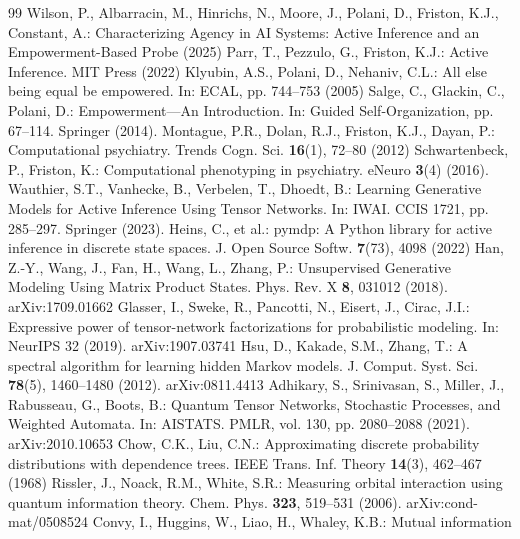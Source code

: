\documentclass[runningheads]{llncs}
\begin{document}
\begin{thebibliography}{99}
 Wilson, P., Albarracin, M., Hinrichs, N., Moore, J.,
Polani, D., Friston, K.J., Constant, A.: Characterizing Agency in AI Systems: Active
Inference and an Empowerment-Based Probe (2025)
 Parr, T., Pezzulo, G., Friston, K.J.: Active Inference. MIT Press (2022)
 Klyubin, A.S., Polani, D., Nehaniv, C.L.: All else being equal be
empowered. In: ECAL, pp. 744--753 (2005)
 Salge, C., Glackin, C., Polani, D.: Empowerment---An Introduction.
In: Guided Self-Organization, pp. 67--114. Springer (2014). 
 Montague, P.R., Dolan, R.J., Friston, K.J., Dayan, P.:
Computational psychiatry. Trends Cogn. Sci. \textbf{16}(1), 72--80 (2012)
 Schwartenbeck, P., Friston, K.: Computational phenotyping in
psychiatry. eNeuro \textbf{3}(4) (2016). 
 Wauthier, S.T., Vanhecke, B., Verbelen, T., Dhoedt, B.: Learning
Generative Models for Active Inference Using Tensor Networks. In: IWAI. CCIS 1721,
pp. 285--297. Springer (2023). 
 Heins, C., et al.: pymdp: A Python library for active inference
in discrete state spaces. J. Open Source Softw. \textbf{7}(73), 4098 (2022)
 Han, Z.-Y., Wang, J., Fan, H., Wang, L., Zhang, P.: Unsupervised
Generative Modeling Using Matrix Product States. Phys. Rev. X \textbf{8}, 031012 (2018).
arXiv:1709.01662
 Glasser, I., Sweke, R., Pancotti, N., Eisert, J., Cirac, J.I.:
Expressive power of tensor-network factorizations for probabilistic modeling. In:
NeurIPS 32 (2019). arXiv:1907.03741
 Hsu, D., Kakade, S.M., Zhang, T.: A spectral algorithm for learning
hidden Markov models. J. Comput. Syst. Sci. \textbf{78}(5), 1460--1480 (2012).
arXiv:0811.4413
 Adhikary, S., Srinivasan, S., Miller, J., Rabusseau, G.,
Boots, B.: Quantum Tensor Networks, Stochastic Processes, and Weighted Automata. In:
AISTATS. PMLR, vol. 130, pp. 2080--2088 (2021). arXiv:2010.10653
 Chow, C.K., Liu, C.N.: Approximating discrete probability
distributions with dependence trees. IEEE Trans. Inf. Theory \textbf{14}(3), 462--467 (1968)
 Rissler, J., Noack, R.M., White, S.R.: Measuring orbital
interaction using quantum information theory. Chem. Phys. \textbf{323}, 519--531 (2006).
arXiv:cond-mat/0508524
 Convy, I., Huggins, W., Liao, H., Whaley, K.B.: Mutual information

\end{thebibliography}
\end{document}
